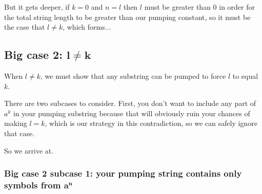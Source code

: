 \documentclass{report}
\begin{document}
But it gets deeper, if $k = 0$ and $n = l$ then $l$ must be greater than 0 in order for the total string length to be greater than our pumping constant, so it must be the case that $l \neq k$, which forms...

\subsection*{Big case 2: $\mathbf{l \neq k}$} 

When $l \neq k$, we must show that any substring can be pumped to force $l$ to equal $k$.

There are two subcases to consider. First, you don't want to include any part of $a^k$ in your pumping substring because that will obviously ruin your chances of making $l = k$, which is our strategy in this contradiction, so we can safely ignore that case.

So we arrive at.

\subsubsection*{Big case 2 subcase 1: your pumping string contains only symbols from $\mathbf{a^n}$}
\end{document}
